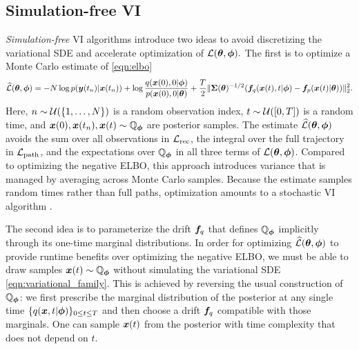 \subsection{Simulation-free VI}\label{subsec:sim-free}
\emph{Simulation-free} VI algorithms introduce two ideas to avoid discretizing the variational SDE and accelerate optimization of $\mathcal{L}(\boldsymbol{\theta}, \boldsymbol{\phi}).$
The first is to optimize
a Monte Carlo estimate of \cref{eqn:elbo}
\begin{equation*}
    \widehat{\mathcal{L}}(\boldsymbol{\theta}, \boldsymbol{\phi}) = -N \log p(\boldsymbol{y}(t_n) | \boldsymbol{x}(t_n)) + \log\frac{q(\boldsymbol{x}(0), 0 | \boldsymbol{\phi})}{p(\boldsymbol{x}(0), 0 | \boldsymbol{\theta})} + \frac{T}{2} \|\boldsymbol{\Sigma}(\boldsymbol{\theta})^{-1/2}(\boldsymbol{f}_q(\boldsymbol{x}(t), t | \boldsymbol{\phi}) - \boldsymbol{f}_p(\boldsymbol{x}(t) | \boldsymbol{\theta}))\|_2^2.
\end{equation*}
Here, $n \sim \mathcal{U}(\{1, \dots, N\})$ is a random observation index, $t \sim \mathcal{U}([0, T])$ is a random time, and $\boldsymbol{x}(0), \boldsymbol{x}(t_n), \boldsymbol{x}(t) \sim \mathbb{Q}_{\boldsymbol{\phi}}$ are posterior samples.
The estimate $\widehat{\mathcal{L}}(\boldsymbol{\theta}, \boldsymbol{\phi})$ avoids the sum over all observations in $\mathcal{L}_{\mathrm{rec}}$, the integral over the full trajectory in $\mathcal{L}_{\mathrm{path}}$, and the expectations over $\mathbb{Q}_{\boldsymbol{\phi}}$ in all three terms of $\mathcal{L}(\boldsymbol{\theta}, \boldsymbol{\phi})$. 
Compared to optimizing the negative ELBO, this approach introduces variance that is managed by averaging across Monte Carlo samples.
Because the estimate samples random times rather than full paths, optimization amounts to a stochastic VI algorithm \cite{hoffman2013stochastic}.

The second idea is to parameterize the drift $\boldsymbol{f}_q$ that defines $\mathbb{Q}_{\boldsymbol{\phi}}$ implicitly through its one-time marginal distributions.
In order for optimizing $\widehat{\mathcal{L}}(\boldsymbol{\theta}, \boldsymbol{\phi})$ to provide runtime benefits over optimizing the negative ELBO, we must be able to draw samples $\boldsymbol{x}(t) \sim \mathbb{Q}_{\boldsymbol{\phi}}$ without simulating the variational SDE \cref{eqn:variational_family}.
This is achieved by reversing the usual construction of $\mathbb{Q}_{\boldsymbol{\phi}}$: we first prescribe the marginal distribution of the posterior at any single time $\{q(\boldsymbol{x},t|\boldsymbol{\phi})\}_{0 \leq t \leq T}$ and then choose a drift $\boldsymbol{f}_q$ compatible with those marginals.
One can sample $\boldsymbol{x}(t)$ from the posterior with time complexity that does not depend on $t$.

